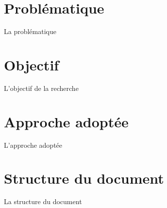 \section{Problématique}
La problématique
\section{Objectif}
L'objectif de la recherche
\section{Approche adoptée}
L'approche adoptée
\section{Structure du document}
La structure du document
